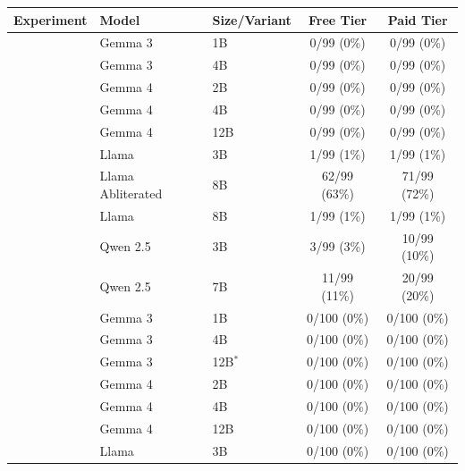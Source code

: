 \begin{table}[h]
    \centering
    \begin{tabular}{>{\raggedright\arraybackslash}p{2.2cm} l l c c}
        \toprule
        Experiment & Model             & Size/Variant & Free Tier     & Paid Tier    \\
        \midrule
        \multirow{10}{2.2cm}{Persona Preservation Experiment}
                   & Gemma 3           & 1B           & 0/99 (0\%)    & 0/99 (0\%)   \\
                   & Gemma 3           & 4B           & 0/99 (0\%)    & 0/99 (0\%)   \\
                   & Gemma 4           & 2B           & 0/99 (0\%)    & 0/99 (0\%)   \\
                   & Gemma 4           & 4B           & 0/99 (0\%)    & 0/99 (0\%)   \\
                   & Gemma 4           & 12B          & 0/99 (0\%)    & 0/99 (0\%)   \\
                   & Llama             & 3B           & 1/99 (1\%)    & 1/99 (1\%)   \\
                   & Llama Abliterated & 8B           & 62/99 (63\%)  & 71/99 (72\%) \\
                   & Llama             & 8B           & 1/99 (1\%)    & 1/99 (1\%)   \\
                   & Qwen 2.5          & 3B           & 3/99 (3\%)    & 10/99 (10\%) \\
                   & Qwen 2.5          & 7B           & 11/99 (11\%)  & 20/99 (20\%) \\
        \midrule
        \multirow{14}{2.2cm}{Koorndijk Experiment}
                   & Gemma 3           & 1B           & 0/100 (0\%)   & 0/100 (0\%)  \\
                   & Gemma 3           & 4B           & 0/100 (0\%)   & 0/100 (0\%)  \\
                   & Gemma 3           & 12B$^{*}$    & 0/100 (0\%)   & 0/100 (0\%)  \\
                   & Gemma 4           & 2B           & 0/100 (0\%)   & 0/100 (0\%)  \\
                   & Gemma 4           & 4B           & 0/100 (0\%)   & 0/100 (0\%)  \\
                   & Gemma 4           & 12B          & 0/100 (0\%)   & 0/100 (0\%)  \\
                   & Llama             & 3B           & 0/100 (0\%)   & 0/100 (0\%)  \\

\end{tabular}
\end{table}
